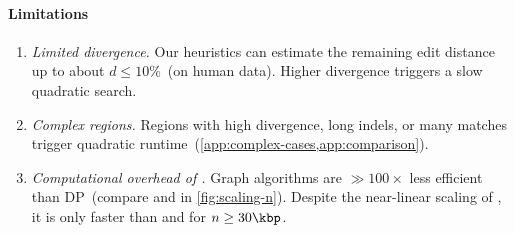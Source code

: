 \paragraph{Limitations} \phantom{x}
\nopagebreaklist

\begin{enumerate}
  \item \emph{Limited divergence.} %
        Our heuristics can estimate the remaining edit distance up to about
        $d{\leq}10\%$~(on human data). Higher divergence triggers a slow
        quadratic search.
  \item \emph{Complex regions.} %
        Regions with high divergence, long indels, or many matches trigger
        quadratic runtime~(\cref{app:complex-cases,app:comparison}).
  \item \emph{Computational overhead of \A.} %
        Graph algorithms are ${\gg} 100\times$ less efficient than DP~(compare
        \dijkstra and \edlib in \cref{fig:scaling-n}). Despite the near-linear
        scaling of \astarpa, it is only faster than \edlib and \wfa for $n \geq 30\kbp$.
\end{enumerate}
